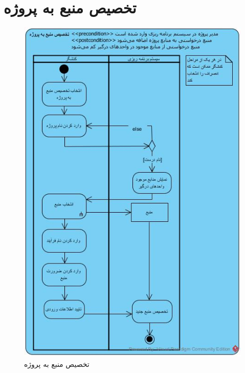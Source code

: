 \section{تخصیص منبع به پروژه}
\begin{figure}[H]
	\centering
	\includegraphics[scale=0.65]{img/activity/AllocateResourceToProject}
	\caption{تخصیص منبع به پروژه}
\end{figure}


